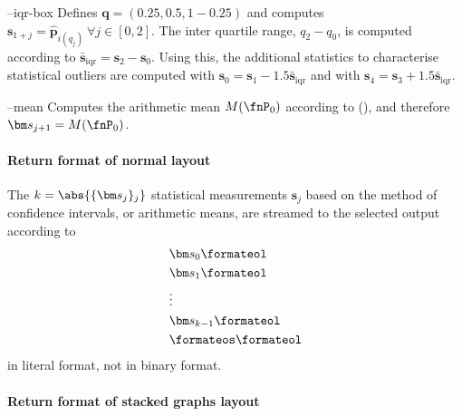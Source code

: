 \begin{procarg}{--iqr-box}
  Defines $\bm q = (\num{0.25}, {0.5}, 1 - \num{0.25})$ and computes $\bm s_{1+j} = \widehat{\bm p}_{i(q_j)}\ \forall j \in [0,2]$. The inter quartile range, $q_2 - q_0$, is computed according to ${\bar{\bm s}}_{\text{iqr}} = \bm s_2 - \bm s_0$. Using this, the additional statistics to characterise statistical outliers are computed with $\bm s_0 = \bm s_1 - \num{1.5} {\bar{\bm s}}_{\text{iqr}}$ and with $\bm s_4 = \bm s_3 + \num{1.5} {\bar{\bm s}}_{\text{iqr}}$.
\end{procarg}

\begin{procarg}{--mean}
  Computes the arithmetic mean $M(\fnP_0)$ according to (), and therefore $\bm s_{j+1} = M(\fnP_0)$.
\end{procarg}

\procargsilent

\paragraph{Return format of normal layout}

The $k = \abs{\{\bm s_j\}_j}$ statistical measurements $\bm s_j$ based on the method of confidence intervals, or arithmetic means, are streamed to the selected output according to
\begin{align*}
  &\bm s_0\formateol\\
  &\bm s_1\formateol\\
  &\vdots \\
  &\bm s_{k-1}\formateol\\
  &\formateos\formateol
\end{align*}
in literal format, not in binary format.

\paragraph{Return format of stacked graphs layout}


